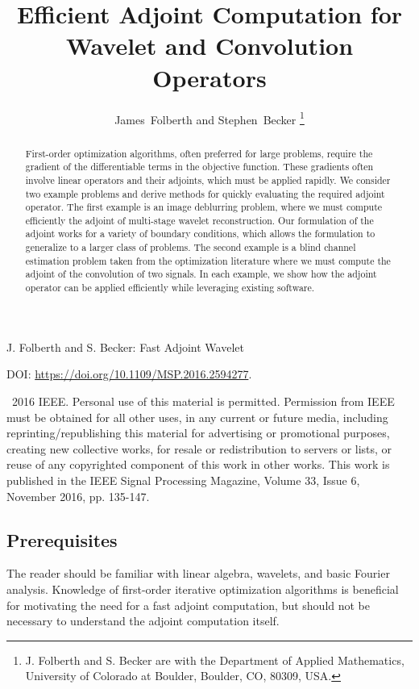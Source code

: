 \documentclass[journal]{IEEEtran}
\begin{document}
\title{Efficient Adjoint Computation for Wavelet and Convolution Operators}
\author{James~Folberth and 
        Stephen~Becker%
\thanks{J. Folberth and S. Becker are with the Department
of Applied Mathematics, University of Colorado at Boulder,
Boulder, CO, 80309, USA.}}

%
{J. Folberth and S. Becker: Fast Adjoint Wavelet}

\maketitle

\begin{abstract}
   First-order optimization algorithms, often preferred for large problems, require the gradient of the differentiable terms in the objective function.  These gradients often involve linear operators and their adjoints, which must be applied rapidly.  We consider two example problems and derive methods for quickly evaluating the required adjoint operator.  The first example is an image deblurring problem, where we must compute efficiently the adjoint of multi-stage wavelet reconstruction.  Our formulation of the adjoint works for a variety of boundary conditions, which allows the formulation to generalize to a larger class of problems.  The second example is a blind channel estimation problem taken from the optimization literature where we must compute the adjoint of the convolution of two signals.  In each example, we show how the adjoint operator can be applied efficiently while leveraging existing software.
\end{abstract}

DOI: \url{https://doi.org/10.1109/MSP.2016.2594277}.

\textcopyright\, 2016 IEEE. Personal use of this material is permitted. Permission from IEEE must be obtained for all other uses, in any current or future media, including reprinting/republishing this material for advertising or promotional purposes, creating new collective works, for resale or redistribution to servers or lists, or reuse of any copyrighted component of this work in other works.
This work is published in the IEEE Signal Processing Magazine, Volume 33, Issue 6, November 2016, pp. 135-147.

\subsection*{Prerequisites}
The reader should be familiar with linear algebra, wavelets, and basic Fourier analysis.  Knowledge of first-order iterative optimization algorithms is beneficial for motivating the need for a fast adjoint computation, but should not be necessary to understand the adjoint computation itself.
\end{document}
